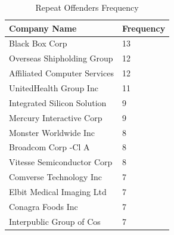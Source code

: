 \documentclass[conference]{IEEEtran}
\begin{document}
\begin{table}[H]
\caption{Repeat Offenders Frequency}
\centering
\begin{tabular}{@{}p{6.3cm}p{2.1cm}@{}} 
\toprule
\textbf{\hspace{5mm}Company Name} & \textbf{Frequency}\hspace{5mm} \\
\midrule
\hspace{5mm}Black Box Corp & 13\hspace{5mm} \\
\hspace{5mm}Overseas Shipholding Group & 12\hspace{5mm} \\
\hspace{5mm}Affiliated Computer Services & 12\hspace{5mm} \\
\hspace{5mm}UnitedHealth Group Inc & 11\hspace{5mm} \\
\hspace{5mm}Integrated Silicon Solution & 9\hspace{5mm} \\
\hspace{5mm}Mercury Interactive Corp & 9\hspace{5mm} \\
\hspace{5mm}Monster Worldwide Inc & 8\hspace{5mm} \\
\hspace{5mm}Broadcom Corp -Cl A & 8\hspace{5mm} \\
\hspace{5mm}Vitesse Semiconductor Corp & 8\hspace{5mm} \\
\hspace{5mm}Comverse Technology Inc & 7\hspace{5mm} \\
\hspace{5mm}Elbit Medical Imaging Ltd & 7\hspace{5mm}  \\
\hspace{5mm}Conagra Foods Inc & 7\hspace{5mm} \\
\hspace{5mm}Interpublic Group of Cos & 7\hspace{5mm} \\

\end{tabular}
\end{table}
\end{document}

